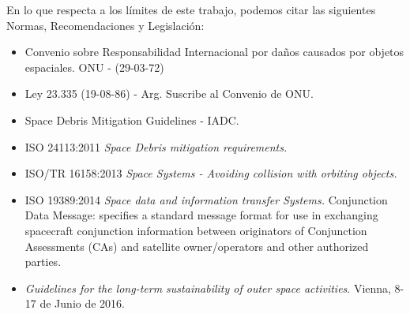 En lo que respecta a los l\'imites de este trabajo, podemos citar las siguientes Normas, Recomendaciones y Legislaci\'on:\\

\begin{itemize} 
\item Convenio sobre Responsabilidad Internacional por da\~nos causados por objetos espaciales. ONU - (29-03-72)
\item Ley 23.335 (19-08-86) - Arg. Suscribe al Convenio de ONU.
\item Space Debris Mitigation Guidelines - IADC.
\item ISO 24113:2011 {\it{Space Debris mitigation requirements.}}
\item ISO/TR 16158:2013 {\it{Space Systems - Avoiding collision with orbiting objects.}}
\item ISO 19389:2014 {\it{Space data and information transfer Systems.}} Conjunction Data Message: specifies a standard message format for use in exchanging spacecraft conjunction information between originators of Conjunction Assessments (CAs) and satellite owner/operators and other authorized parties.
\item {\it{Guidelines for the long-term sustainability of outer space activities}}. Vienna, 8-17 de Junio de 2016.
\end{itemize}

